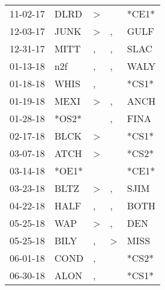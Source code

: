 \begin{supertabular}{p{0.07\textwidth}p{0.06\textwidth}p{0.02\textwidth}p{0.02\textwidth}p{0.06\textwidth}}
 11-02-17\textsuperscript{} &           DLRD\textsuperscript{} &     \textgreater &               &                   *CE1* \\
 12-03-17\textsuperscript{} &           JUNK\textsuperscript{} &     \textgreater &             , &  GULF\textsuperscript{} \\
 12-31-17\textsuperscript{} &           MITT\textsuperscript{} &                , &             , &  SLAC\textsuperscript{} \\
 01-13-18\textsuperscript{} &            n2f\textsuperscript{} &                , &             , &  WALY\textsuperscript{} \\
 01-18-18\textsuperscript{} &           WHIS\textsuperscript{} &                , &               &                   *CS1* \\
 01-19-18\textsuperscript{} &           MEXI\textsuperscript{} &     \textgreater &             , &  ANCH\textsuperscript{} \\
 01-28-18\textsuperscript{} &                            *OS2* &                  &             , &  FINA\textsuperscript{} \\
 02-17-18\textsuperscript{} &           BLCK\textsuperscript{} &     \textgreater &               &                   *CS1* \\
 03-07-18\textsuperscript{} &           ATCH\textsuperscript{} &     \textgreater &               &                   *CS2* \\
 03-14-18\textsuperscript{} &                            *OE1* &                  &               &                   *CE1* \\
 03-23-18\textsuperscript{} &           BLTZ\textsuperscript{} &     \textgreater &             , &  SJIM\textsuperscript{} \\
 04-22-18\textsuperscript{} &           HALF\textsuperscript{} &                , &             , &  BOTH\textsuperscript{} \\
 05-25-18\textsuperscript{} &            WAP\textsuperscript{} &     \textgreater &             , &   DEN\textsuperscript{} \\
 05-25-18\textsuperscript{} &           BILY\textsuperscript{} &                , &  \textgreater &  MISS\textsuperscript{} \\
 06-01-18\textsuperscript{} &           COND\textsuperscript{} &                , &               &                   *CS2* \\
 06-30-18\textsuperscript{} &           ALON\textsuperscript{} &                , &               &                   *CS1* \\

\end{supertabular}
